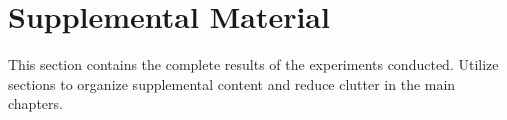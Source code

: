 \chapter{Supplemental Material}\label{sup}

This section contains the complete results of the experiments conducted.
Utilize sections to organize supplemental content and reduce clutter in the main chapters.
